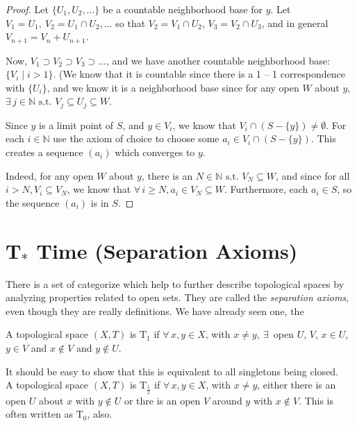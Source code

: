 \documentclass[12pt]{report}
\newcommand{\define}{  \noindent{\sc Definition }\hspace{5pt} }
\newcommand{\fall}{\forall\,}
\newcommand{\exst}{\exists\,}
\newcommand{\st}{\textrm{ s.t. }}
\newcommand{\naturals}{\mathbb{N}}
\newcommand{\T}[1]{$\textrm{T}_#1$}
\begin{document}
\begin{proof}
Let $\{U_1, U_2, \dots \}$ be a countable neighborhood base for $y$.
Let $V_1 = U_1,\ V_2 = U_1 \cap U_2, \dots$ so that $V_2 = V_1 \cap U_2$, 
$V_3 = V_2 \cap U_3$, and in general $V_{n + 1} = V_n + U_{n + 1}$.

Now, $V_1 \supset V_2 \supset V_3 \supset \dots$, and we have another
countable neighborhood base: $\{V_i \mid i > 1\}$. (We know that it is
countable since there is a 1 -- 1 correspondence with $\{U_i\}$, and we know it
is a neighborhood base since for any open $W$ about $y$, $\exst j \in
\naturals \st V_j \subseteq U_j  \subseteq W$.

Since $y$ is a limit point of $S$, and $y \in V_i$, we know that $V_i \cap (S
- \{y\}) \neq \emptyset$. For each $i \in \naturals$ use the axiom of choice to
choose some $a_i \in V_i \cap (S - \{y\})$. This creates a sequence $(a_i)$
which converges to $y$.  

Indeed, for any open $W$ about $y$, there is an $N \in \naturals \st V_N
\subseteq W$, and since for all $i > N, V_i \subseteq V_N$, we know that
$\fall i \geq N, a_i \in V_N \subseteq W$. Furthermore, each $a_i \in S$, so
the sequence $(a_i)$ is in $S$. 
\end{proof}
 
\section{T$_*$ Time (Separation Axioms)}

There is a set of categorize which help to further describe topological spaces
by analyzing properties related to open sets. They are called the 
 {\em separation axioms}, even though they are really
definitions. We have already seen one, the  

\define A topological space $(X,T)$ is  {\em \T{1}} if 
$\fall x,y \in X$, with $x \neq y,\ \exst$ open $U$, $V$, $x \in U$, $y \in V$
and $x \not \in V$ and $y \not \in U$. 

It should be easy
to show that this is equivalent to all singletons being closed.\\

\define A topological space $(X,T)$ is 
{\em \T{\frac{1}{2}}} if $\fall x,y \in X$,
with $x \neq y$, either there is an open $U$ about $x$ with $y \not \in U$ or
thre is an open $V$ around $y$ with $x \not \in V$. This is often written as
 {\em \T{0}}, also.\\
\end{document}
